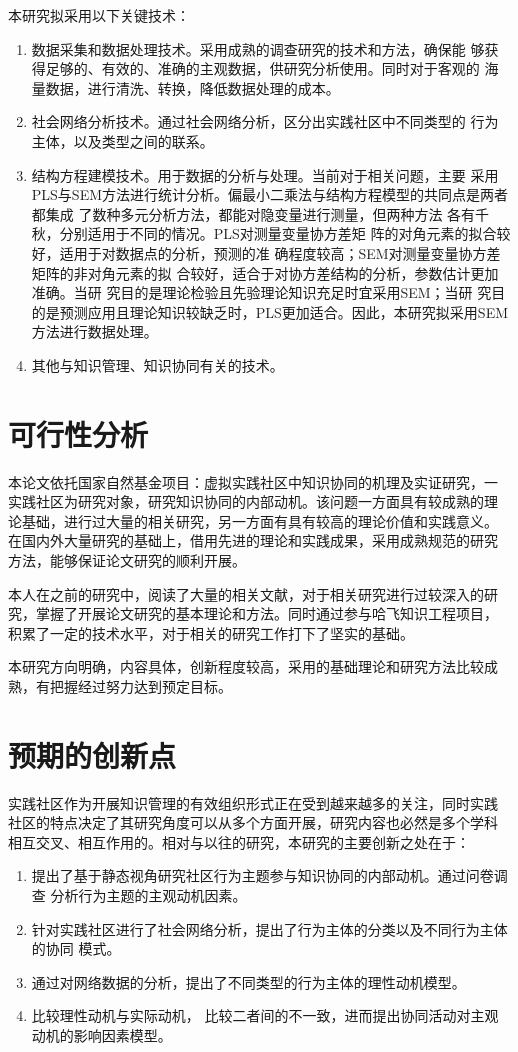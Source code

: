 \documentclass[12pt,a4paper]{ctexart}
\begin{document}
本研究拟采用以下关键技术：
\begin{enumerate}
\item  数据采集和数据处理技术。采用成熟的调查研究的技术和方法，确保能
  够获得足够的、有效的、准确的主观数据，供研究分析使用。同时对于客观的
  海量数据，进行清洗、转换，降低数据处理的成本。
\item  社会网络分析技术。通过社会网络分析，区分出实践社区中不同类型的
  行为主体，以及类型之间的联系。
\item  结构方程建模技术。用于数据的分析与处理。当前对于相关问题，主要
  采用PLS与SEM方法进行统计分析。偏最小二乘法与结构方程模型的共同点是两者都集成
了数种多元分析方法，都能对隐变量进行测量，但两种方法
各有千秋，分别适用于不同的情况。PLS对测量变量协方差矩
阵的对角元素的拟合较好，适用于对数据点的分析，预测的准
确程度较高；SEM对测量变量协方差矩阵的非对角元素的拟
合较好，适合于对协方差结构的分析，参数估计更加准确。当研
究目的是理论检验且先验理论知识充足时宜采用SEM；当研
究目的是预测应用且理论知识较缺乏时，PLS更加适合。因此，本研究拟采用SEM
方法进行数据处理。
\item  其他与知识管理、知识协同有关的技术。
\end{enumerate}
\section{可行性分析}
本论文依托国家自然基金项目：虚拟实践社区中知识协同的机理及实证研究，一
实践社区为研究对象，研究知识协同的内部动机。该问题一方面具有较成熟的理
论基础，进行过大量的相关研究，另一方面有具有较高的理论价值和实践意义。
在国内外大量研究的基础上，借用先进的理论和实践成果，采用成熟规范的研究
方法，能够保证论文研究的顺利开展。

本人在之前的研究中，阅读了大量的相关文献，对于相关研究进行过较深入的研
究，掌握了开展论文研究的基本理论和方法。同时通过参与哈飞知识工程项目，
积累了一定的技术水平，对于相关的研究工作打下了坚实的基础。

本研究方向明确，内容具体，创新程度较高，采用的基础理论和研究方法比较成
熟，有把握经过努力达到预定目标。
\section{预期的创新点}
实践社区作为开展知识管理的有效组织形式正在受到越来越多的关注，同时实践
社区的特点决定了其研究角度可以从多个方面开展，研究内容也必然是多个学科
相互交叉、相互作用的。相对与以往的研究，本研究的主要创新之处在于：
\begin{enumerate}
\item 提出了基于静态视角研究社区行为主题参与知识协同的内部动机。通过问卷调查
  分析行为主题的主观动机因素。
\item  针对实践社区进行了社会网络分析，提出了行为主体的分类以及不同行为主体的协同
  模式。
\item  通过对网络数据的分析，提出了不同类型的行为主体的理性动机模型。
\item  比较理性动机与实际动机，
  比较二者间的不一致，进而提出协同活动对主观动机的影响因素模型。
\end{enumerate}
\end{document}
